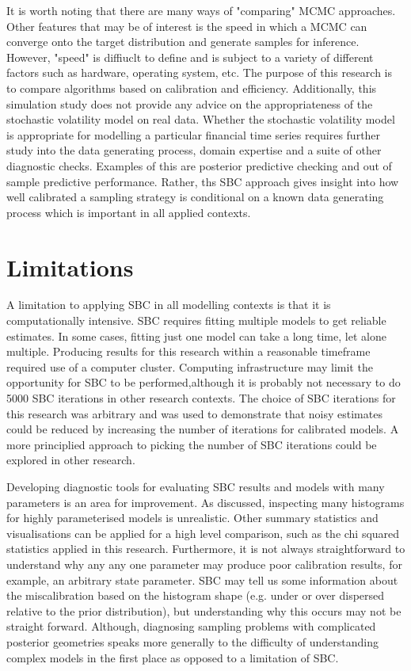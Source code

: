 \documentclass[12pt, a4paper]{article}
\begin{document}
It is worth noting that there are many ways of "comparing" MCMC approaches. Other features that may be of interest is the speed in which a MCMC can converge onto the target distribution and generate samples for inference. However, "speed" is diffiuclt to define and is subject to a variety of different factors such as hardware, operating system, etc. The purpose of this research is to compare algorithms based on calibration and efficiency. Additionally, this simulation study does not provide any advice on the appropriateness of the stochastic volatility model on real data. Whether the stochastic volatility model is appropriate for modelling a particular financial time series requires further study into the data generating process, domain expertise and a suite of other diagnostic checks. Examples of this are posterior predictive checking and out of sample predictive performance. Rather, ths SBC approach gives insight into how well calibrated a sampling strategy is conditional on a known data generating process which is important in all applied contexts.  


\section{Limitations}
A limitation to applying SBC in all modelling contexts is that it is computationally intensive. SBC requires fitting multiple models to get reliable estimates. In some cases, fitting just one model can take a long time, let alone multiple. Producing results for this research within a reasonable timeframe required use of a computer cluster. Computing infrastructure may limit the opportunity for SBC to be performed,although it is probably not necessary to do 5000 SBC iterations in other research contexts. The choice of SBC iterations for this research was arbitrary and was used to demonstrate that noisy estimates could be reduced by increasing the number of iterations for calibrated models. A more principlied approach to picking the number of SBC iterations could be explored in other research.

Developing diagnostic tools for evaluating SBC results and models with many parameters is an area for improvement. As discussed, inspecting many histograms for highly parameterised models is unrealistic. Other summary statistics and visualisations can be applied for a high level comparison, such as the chi squared statistics applied in this research. Furthermore, it is not always straightforward to understand why any any one parameter may produce poor calibration results, for example, an arbitrary state parameter. SBC may tell us some information about the miscalibration based on the histogram shape (e.g. under or over dispersed relative to the prior distribution), but understanding why this occurs may not be straight forward. Although, diagnosing sampling problems with complicated posterior geometries speaks more generally to the difficulty of understanding complex models in the first place as opposed to a limitation of SBC.
\end{document}
